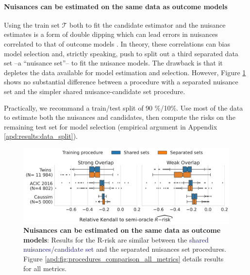 \documentclass[11pt]{article}
\let\cite=\supercite
\begin{document}
\paragraph{Nuisances can be estimated on the same data as outcome models}

Using the train set $\mathcal{T}$ both to fit the candidate estimator and the
nuisance estimates is a form of double dipping which can lead errors in
nuisances correlated to that of outcome models
\cite{nie_quasioracle_2017}. In theory, these correlations can bias model
selection and, strictly speaking, push
to split out a third separated data set --a ``nuisance set''-- to fit the
nuisance models. The drawback is that it depletes the data available for
model estimation and selection. However, Figure
\ref{fig:procedures_comparison} shows no substantial difference between a procedure with a separated
nuisance set and the simpler shared nuisance-candidate set procedure.

Practically, we recommand a train/test split of 90 \%/10\%. Use most of the data
to estimate both the nuisances and candidates, then compute the risks on the
remaining test set for model selection (empirical argument in Appendix
\ref{apd:results:data_split}).

\begin{figure}[!tb]
    \centering\begin{minipage}{.75\linewidth}
    \includegraphics[width=\linewidth]{images/_3_procedure_r_risk_only_3datasets_twocols.pdf}
    \end{minipage}

    \caption{\textbf{Nuisances can be estimated on the same data as outcome
            models}: Results for the R-risk are similar between the
        \textcolor{MidnightBlue}{shared
            nuisances/candidate set} and
        the \textcolor{RedOrange}{separated nuisances set} procedures. Figure
        \ref{apd:fig:procedures_comparison_all_metrics} details results for all metrics.}\label{fig:procedures_comparison}
\end{figure}
\end{document}
